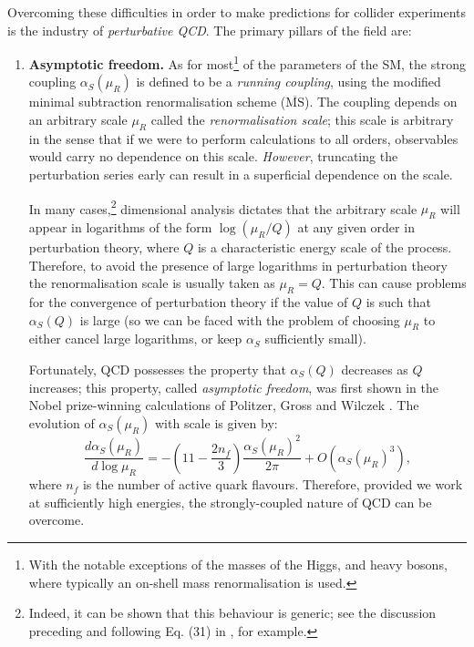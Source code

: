 \documentclass[withindex,glossary]{cam-thesis}
\begin{document}
Overcoming these difficulties in order to make predictions for collider experiments is the industry of \textit{perturbative QCD}. The primary pillars of the field are:
\begin{enumerate}[label = (\arabic*)]
\item \textbf{Asymptotic freedom.} As for most\footnote{With the notable exceptions of the masses of the Higgs, and heavy bosons, where typically an on-shell mass renormalisation is used.} of the parameters of the SM, the strong coupling $\alpha_S(\mu_R)$ is defined to be a \textit{running coupling}, using the modified minimal subtraction renormalisation scheme ($\overline{\text{MS}}$). The coupling depends on an arbitrary scale $\mu_R$ called the \textit{renormalisation scale}; this scale is arbitrary in the sense that if we were to perform calculations to all orders, observables would carry no dependence on this scale. \textit{However}, truncating the perturbation series early can result in a superficial dependence on the scale. 

In many cases,\footnote{Indeed, it can be shown that this behaviour is generic; see the discussion preceding and following Eq. (31) in \cite{Delamotte:2002vw}, for example.} dimensional analysis dictates that the arbitrary scale $\mu_R$ will appear in logarithms of the form $\log(\mu_R / Q)$ at any given order in perturbation theory, where $Q$ is a characteristic energy scale of the process. Therefore, to avoid the presence of large logarithms in perturbation theory the renormalisation scale is usually taken as $\mu_R = Q$. This can cause problems for the convergence of perturbation theory if the value of $Q$ is such that $\alpha_S(Q)$ is large (so we can be faced with the problem of choosing $\mu_R$ to either cancel large logarithms, or keep $\alpha_S$ sufficiently small).

Fortunately, QCD possesses the property that $\alpha_S(Q)$ decreases as $Q$ increases; this property, called \textit{asymptotic freedom}, was first shown in the Nobel prize-winning calculations of Politzer, Gross and Wilczek \cite{Gross:1973id, Politzer:1973fx}. The evolution of $\alpha_S(\mu_R)$ with scale is given by: 
\begin{equation}
\label{eq:alphaSrunning}
\frac{d \alpha_S(\mu_R)}{d\log \mu_R} = - \left( 11 - \frac{2n_f}{3} \right) \frac{\alpha_S(\mu_R)^2}{2\pi} + O(\alpha_S(\mu_R)^3), 
\end{equation}
where $n_f$ is the number of active quark flavours. Therefore, provided we work at sufficiently high energies, the strongly-coupled nature of QCD can be overcome.


\end{enumerate}
\end{document}
